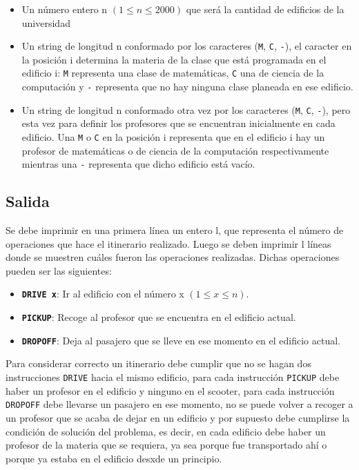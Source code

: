\documentclass[11pt]{article}
\begin{document}
    \begin{itemize}
        \item Un número entero  n $(1 \leq n \leq 2000)$ que será la cantidad de edificios de la universidad
        \item Un string de longitud n conformado por los caracteres (\texttt{M}, \texttt{C}, \texttt{-}), el caracter
              en la posición i determina la materia de la clase que está programada en el edificio i: \texttt{M} representa
              una clase de matemáticas, \texttt{C} una de ciencia de la computación y \texttt{-} representa que no hay ninguna
              clase planeada en ese edificio.
        \item Un string de longitud n conformado otra vez por los caracteres (\texttt{M}, \texttt{C}, \texttt{-}),
              pero esta vez para definir los profesores que se encuentran inicialmente en cada edificio. Una \texttt{M}
              o \texttt{C} en la posición i representa que en el edificio i hay un profesor de matemáticas o de ciencia de la 
              computación respectivamente mientras una \texttt{-} representa que dicho edificio está vacío.
    \end{itemize}

    \subsection{Salida}
    Se debe imprimir en una primera línea un entero l, que representa el número de operaciones que hace el
    itinerario realizado.
    Luego se deben imprimir l líneas donde se muestren cuáles fueron las operaciones realizadas. Dichas operaciones
    pueden ser las siguientes:

    \begin{itemize}
        \item \textbf{\texttt{DRIVE x}}: Ir al edificio con el número x $(1 \leq x \leq n)$.
        \item \textbf{\texttt{PICKUP}}: Recoge al profesor que se encuentra en el edificio actual.
        \item \textbf{\texttt{DROPOFF}}: Deja al pasajero que se lleve en ese momento en el edificio actual.
    \end{itemize}

    Para considerar correcto un itinerario debe cumplir que no se hagan dos instrucciones \texttt{DRIVE}
    hacia el mismo edificio, para cada instrucción \texttt{PICKUP} debe haber un profesor en el edificio y
    ninguno en el scooter, para cada instrucción \texttt{DROPOFF} debe llevarse un pasajero en ese momento,
    no se puede volver a recoger a un profesor que se acaba de dejar en un edificio y por supuesto debe cumplirse
    la condición de solución del problema, es decir, en cada edificio debe haber un profesor de la materia que
    se requiera, ya sea porque fue transportado ahí o porque ya estaba en el edificio desxde un principio.
    
\end{document}
